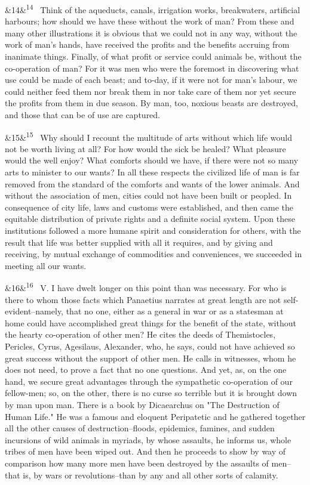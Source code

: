\documentclass[12pt]{article}
\newcommand{\para}[1][]{\par\noindent\ifx&#1&\else\textsuperscript{\footnotesize #1}~\fi}
\begin{document}
\para[14] Think of the aqueducts, canals, irrigation works, breakwaters, artificial harbours; how should we have these without the work of man? From these and many other illustrations it is obvious that we could not in any way, without the work of man's hands, have received the profits and the benefits accruing from inanimate things. Finally, of what profit or service could animals be, without the co-operation of man? For it was men who were the foremost in discovering what use could be made of each beast; and to-day, if it were not for man's labour, we could neither feed them nor break them in nor take care of them nor yet secure the profits from them in due season. By man, too, noxious beasts are destroyed, and those that can be of use are captured.

\para[15] Why should I recount the multitude of arts without which life would not be worth living at all? For how would the sick be healed? What pleasure would the well enjoy? What comforts should we have, if there were not so many arts to minister to our wants? In all these respects the civilized life of man is far removed from the standard of the comforts and wants of the lower animals. And without the association of men, cities could not have been built or peopled. In consequence of city life, laws and customs were established, and then came the equitable distribution of private rights and a definite social system. Upon these institutions followed a more humane spirit and consideration for others, with the result that life was better supplied with all it requires, and by giving and receiving, by mutual exchange of commodities and conveniences, we succeeded in meeting all our wants.

\para[16] V. I have dwelt longer on this point than was necessary. For who is there to whom those facts which Panaetius narrates at great length are not self-evident--namely, that no one, either as a general in war or as a statesman at home could have accomplished great things for the benefit of the state, without the hearty co-operation of other men? He cites the deeds of Themistocles, Pericles, Cyrus, Agesilaus, Alexander, who, he says, could not have achieved so great success without the support of other men. He calls in witnesses, whom he does not need, to prove a fact that no one questions. And yet, as, on the one hand, we secure great advantages through the sympathetic co-operation of our fellow-men; so, on the other, there is no curse so terrible but it is brought down by man upon man. There is a book by Dicaearchus on "The Destruction of Human Life." He was a famous and eloquent Peripatetic and he gathered together all the other causes of destruction--floods, epidemics, famines, and sudden incursions of wild animals in myriads, by whose assaults, he informs us, whole tribes of men have been wiped out. And then he proceeds to show by way of comparison how many more men have been destroyed by the assaults of men--that is, by wars or revolutions--than by any and all other sorts of calamity.
\end{document}
